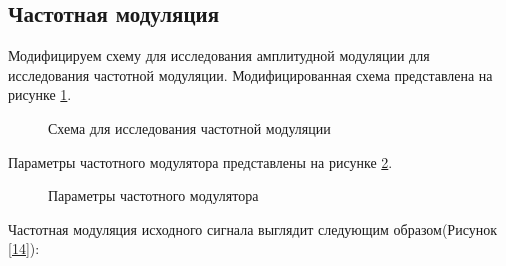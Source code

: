 \documentclass[a4paper,14pt]{extarticle}
\begin{document}
\subsection{Частотная модуляция}

Модифицируем схему для исследования амплитудной модуляции для исследования частотной модуляции. Модифицированная схема представлена на рисунке \ref{12}.

\begin{figure}[H]
\caption{Схема для исследования частотной модуляции}
\label{12}
\end{figure}

Параметры частотного модулятора представлены на рисунке \ref{13}.

\begin{figure}[H]
\caption{Параметры частотного модулятора}
\label{13}
\end{figure}

Частотная модуляция исходного сигнала выглядит следующим образом(Рисунок \ref{14}):
\end{document}
